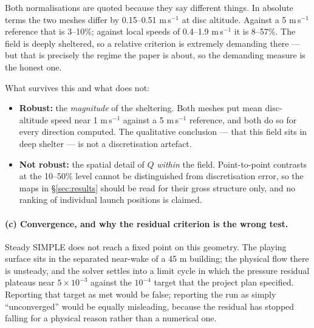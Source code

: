 \documentclass[11pt,letterpaper]{article}
\begin{document}
Both normalisations are quoted because they say different things. In absolute
terms the two meshes differ by 0.15--0.51 m\,s$^{-1}$ at disc altitude. Against
a 5 m\,s$^{-1}$ reference that is 3--10\%; against local speeds of
0.4--1.9 m\,s$^{-1}$ it is 8--57\%. The field is deeply sheltered, so a
relative criterion is extremely demanding there --- but that is precisely the
regime the paper is about, so the demanding measure is the honest one.

What survives this and what does not:
\begin{itemize}[leftmargin=*,itemsep=2pt]
  \item \textbf{Robust:} the \emph{magnitude} of the sheltering. Both meshes
    put mean disc-altitude speed near 1 m\,s$^{-1}$ against a 5 m\,s$^{-1}$
    reference, and both do so for every direction computed. The qualitative
    conclusion --- that this field sits in deep shelter --- is not a
    discretisation artefact.
  \item \textbf{Not robust:} the spatial detail of $Q$ \emph{within} the
    field. Point-to-point contrasts at the 10--50\% level cannot be
    distinguished from discretisation error, so the maps in
    \S\ref{sec:results} should be read for their gross structure only, and
    no ranking of individual launch positions is claimed.
\end{itemize}

\paragraph{(c) Convergence, and why the residual criterion is the wrong test.}
Steady SIMPLE does not reach a fixed point on this geometry. The playing surface
sits in the separated near-wake of a 45 m building; the physical flow there is
unsteady, and the solver settles into a limit cycle in which the pressure
residual plateaus near $5\times10^{-3}$ against the $10^{-4}$ target that the
project plan specified. Reporting that target as met would be false; reporting
the run as simply ``unconverged'' would be equally misleading, because the
residual has stopped falling for a physical reason rather than a numerical one.
\end{document}
